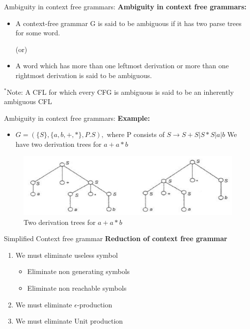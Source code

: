 \documentclass{beamer}
\begin{document}
\begin{frame}{Ambiguity in context free grammars:}
\textbf{Ambiguity in context free grammars:}
\begin{itemize}
	\item A context-free grammar G is said to be ambiguous if it has two parse trees
	for some word.
	\begin{center}
		(or)
	\end{center}
	\item A word which has more than one leftmost derivation or more than one 
	rightmost derivation is said to be ambiguous.

\end{itemize}
$^*$Note: A CFL for which every CFG is ambiguous is said to be an inherently 
ambiguous CFL\\

\end{frame}
\begin{frame}{Ambiguity in context free grammars:}
	\textbf{Example:}
	\begin{itemize}
		\item $G = (\{S\}, \{a, b, +, *\}, P. S),$ where P consists of $S\rightarrow S+S | S*S | a | b$ We have two derivation trees for $a + a * b$
	\end{itemize}
	\begin{figure}
		\includegraphics[scale=.5]{img3/m2}
		\caption{Two derivation trees for $a + a * b$}
	\end{figure}
\end{frame}
\begin{frame}{Simplified Context free grammar}
	\textbf{Reduction of context free grammar}
\begin{enumerate}
	\item We must eliminate useless symbol
	\begin{itemize}
		\item Eliminate non generating symbols
		\item Eliminate non reachable symbols
		
	\end{itemize}
	\item We must eliminate $\epsilon$-production
	\item We must eliminate Unit production
\end{enumerate}
\end{frame}
\end{document}
